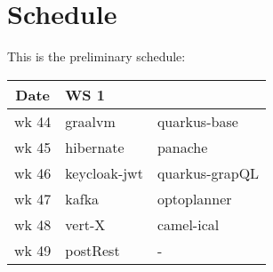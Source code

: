 \clearpage
\section*{Schedule}

This is the preliminary schedule:

\begin{center}
  \begin{tabular}{|c|l|l|}\hline
    \textbf{Date}& \textbf{WS 1}\\\hline
    wk 44 & graalvm & quarkus-base\\\hline
    wk 45 & hibernate & panache\\\hline
    wk 46 & keycloak-jwt & quarkus-grapQL\\\hline
    wk 47 & kafka & optoplanner\\\hline
    wk 48 & vert-X & camel-ical \\\hline
    wk 49 & postRest & - \\\hline
  \end{tabular}
\end{center}

